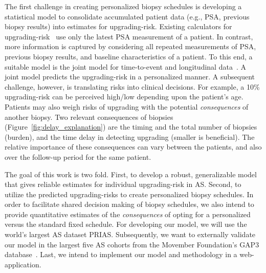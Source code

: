 The first challenge in creating personalized biopsy schedules is developing a statistical model to consolidate accumulated patient data (e.g., PSA, previous biopsy results) into estimates for upgrading-risk. Existing calculators for upgrading-risk~\citep{partin1993use,makarov2007updated} use only the latest PSA measurement of a patient. In contrast, more information is captured by considering all repeated measurements of PSA, previous biopsy results, and baseline characteristics of a patient. To this end, a suitable model is the joint model for time-to-event and longitudinal data~\citep{tomer2019, coley2017prediction,rizopoulos2012joint}. A joint model predicts the upgrading-risk in a personalized manner. A subsequent challenge, however, is translating risks into clinical decisions. For example, a 10\% upgrading-risk can be perceived high/low depending upon the patient's age. Patients may also weigh risks of upgrading with the potential \textit{consequences} of another biopsy. Two relevant consequences of biopsies (Figure~\ref{fig:delay_explanation}) are the timing and the total number of biopsies (burden), and the time delay in detecting upgrading (smaller is beneficial). The relative importance of these consequences can vary between the patients, and also over the follow-up period for the same patient.

The goal of this work is two fold. First, to develop a robust, generalizable model that gives reliable estimates for individual upgrading-risk in AS. Second, to utilize the predicted upgrading-risks to create personalized biopsy schedules. In order to facilitate shared decision making of biopsy schedules, we also intend to provide quantitative estimates of the \textit{consequences} of opting for a personalized versus the standard fixed schedule. For developing our model, we will use the world's largest AS dataset PRIAS. Subsequently, we want to externally validate our model in the largest five AS cohorts from the Movember Foundation's GAP3 database~\citep{gap3_2018}. Last, we intend to implement our model and methodology in a web-application.